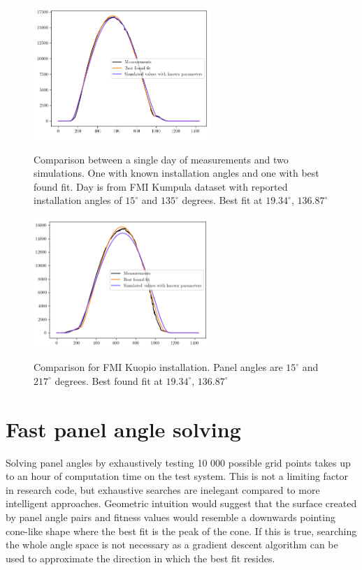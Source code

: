 \begin{figure}[h]
\caption{Comparison between a single day of measurements and two simulations. One with known installation angles and one with best found fit. Day is from FMI Kumpula dataset with reported installation angles of $15^\circ$ and $135^\circ$ degrees. Best fit at $19.34^\circ$, $136.87^\circ$}
\centering
\includegraphics[width=0.6\textwidth]{pics/10kfitshelsinkiplot}
\label{10khelsinkiplot}
\end{figure}


\begin{figure}[h]
\caption{Comparison for FMI Kuopio installation. Panel angles are $15^\circ$ and $217^\circ$ degrees. Best found fit at $19.34^\circ$, $136.87^\circ$
}
\centering
\includegraphics[width=0.6\textwidth]{pics/10kfitskuopioplots}
\label{10kkuopioplot}
\end{figure}


\section{Fast panel angle solving}
Solving panel angles by exhaustively testing 10 000 possible grid points takes up to an hour of computation time on the test system. This is not a limiting factor in research code, but exhaustive searches are inelegant compared to more intelligent approaches. Geometric intuition would suggest that the surface created by panel angle pairs and fitness values would resemble a downwards pointing cone-like shape where the best fit is the peak of the cone. If this is true, searching the whole angle space is not necessary as a gradient descent algorithm can be used to approximate the direction in which the best fit resides.

